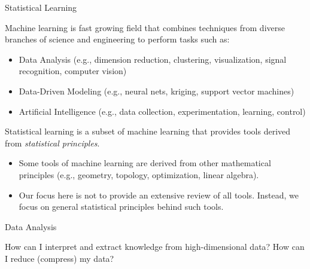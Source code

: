 \documentclass[9pt]{beamer}
\begin{document}
%
\begin{frame}{Statistical Learning}

\begin{block}{}
Machine learning is fast growing field that combines techniques from diverse branches of science and engineering to perform tasks such as:
\end{block}
\begin{itemize}
\item Data Analysis (e.g., dimension reduction, clustering, visualization, signal recognition, computer vision)
\item Data-Driven Modeling (e.g., neural nets, kriging, support vector machines)
\item Artificial Intelligence (e.g., data collection, experimentation, learning, control)
\end{itemize}
\begin{block}{}
Statistical learning is a subset of machine learning that provides tools derived from {\em statistical principles}. 
\end{block}
\begin{itemize}
\item Some tools of machine learning are derived from other mathematical principles (e.g., geometry, topology, optimization, linear algebra). 
\item Our focus here is not to provide an extensive review of all tools. Instead, we focus on general statistical principles behind such tools.  
\end{itemize}
\end{frame}


%
\begin{frame}{Data Analysis}

\begin{block}{}
How can I interpret and extract knowledge from high-dimensional data? How can I reduce (compress) my data? 
\end{block}

\end{frame}
\end{document}
